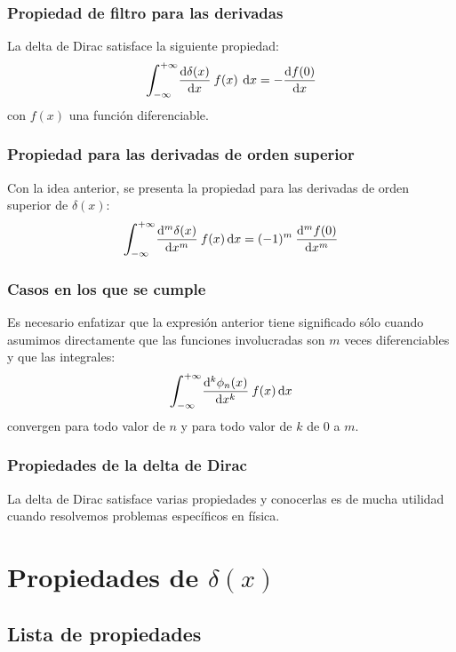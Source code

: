 \documentclass[12pt]{beamer}
\begin{document}
\begin{frame}
\frametitle{Propiedad de filtro para las derivadas}
La delta de Dirac satisface la siguiente propiedad:
\pause
\begin{align*}
\scaleint{6ex}_{\bs -\infty}^{+\infty} \dv{\delta(x)}{x} \: f (x) \: \dd{x} = - \dv{f (0)}{x}
\end{align*}
con $f (x)$ una función diferenciable.
\end{frame}

\begin{frame}
\frametitle{Propiedad para las derivadas de orden superior}
Con la idea anterior, se presenta la propiedad para las derivadas de orden superior de $\delta (x)$:
\pause
\begin{align*}
\scaleint{6ex}_{\bs -\infty}^{+\infty} \dv[m]{\delta (x)}{x} \: f (x) \dd{x} =  (-1)^{m} \: \dv[m]{f (0)}{x}
\end{align*}
\end{frame}

\begin{frame}
\frametitle{Casos en los que se cumple}
Es necesario enfatizar que la expresión anterior tiene significado sólo cuando asumimos directamente que las funciones involucradas son $m$ veces diferenciables y que las integrales:
\pause
\begin{align*}
\scaleint{6ex}_{\bs -\infty}^{+\infty} \dv[k]{\phi_{n}(x)}{x} \: f (x) \dd{x}
\end{align*}
convergen para todo valor de $n$ y para todo valor de $k$ de $0$ a $m$.
\end{frame}

\begin{frame}
\frametitle{Propiedades de la delta de Dirac}
La delta de Dirac satisface varias propiedades y conocerlas es de mucha utilidad cuando resolvemos problemas específicos en física. 
\end{frame}

\section{Propiedades de \texorpdfstring{$\delta (x)$}{d (x)}}
\subsection{Lista de propiedades}
\end{document}
